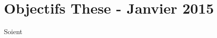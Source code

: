 \documentclass[12pt]{article}
\begin{document}
\section{Objectifs These - Janvier 2015}

Soient
\end{document}
